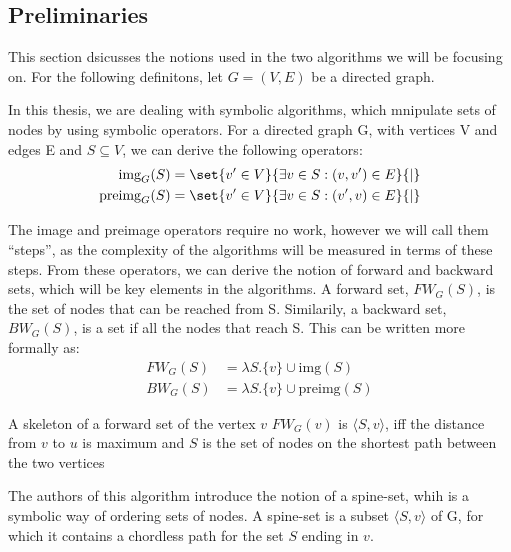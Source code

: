 \documentclass[../master/master.tex]{subfiles}
\newcommand{\FW}[2][G]{\ensuremath{FW_{#1}(#2)}}
\newcommand{\BW}[2][G]{\ensuremath{BW_{#1}(#2)}}
\newcommand{\pair}[2]{\ensuremath{\langle #1, #2\rangle}}
\newcommand{\img}[2][G]{\ensuremath{\text{img}_{#1}(#2)}}
\newcommand{\pre}[2][G]{\ensuremath{\text{preimg}_{#1}(#2)}}
\begin{document}
\subsection{Preliminaries}

This section dsicusses the notions used in the two algorithms we will be focusing on. For the following definitons, let $G=(V,E)$ be a directed graph.

In this thesis, we are dealing with symbolic algorithms, which mnipulate sets of nodes by using symbolic operators. For a directed graph G, with vertices V and edges E and $S\subseteq V$, we can derive the following operators:
\begin{align*}
\img S &= \set{v' \in V}{\exists v\in S:(v, v')\in E}{|}\\
\pre S &= \set{v' \in V}{\exists v\in S:(v', v)\in E}{|}
\end{align*}

The image and preimage operators require no work, however we will call them ``steps'', as the complexity of the algorithms will be measured in terms of these steps.
From these operators, we can derive the notion of forward and backward sets, which will be key elements in the algorithms. A forward set, \FW{S}, is the set of nodes that can be reached from S. Similarily, a backward set, \BW{S}, is a set if all the nodes that reach S. This can be written more formally as:
\begin{align*}
\FW{S} &= \lambda S.\{v\}\cup \text{img}(S)\\
\BW{S} &= \lambda S.\{v\}\cup \text{preimg}(S)
\end{align*}

A skeleton of a forward set of the vertex $v$ \FW{v} is \pair{S}{v}, iff the distance from $v$ to $u$ is maximum and $S$ is the set of nodes on the shortest path between the two vertices

The authors of this algorithm introduce the notion of a spine-set, whih is a symbolic way of ordering sets of nodes. A spine-set is a subset \pair{S}{v} of G, for which it contains a chordless path for the set $S$ ending in $v$.
\end{document}
